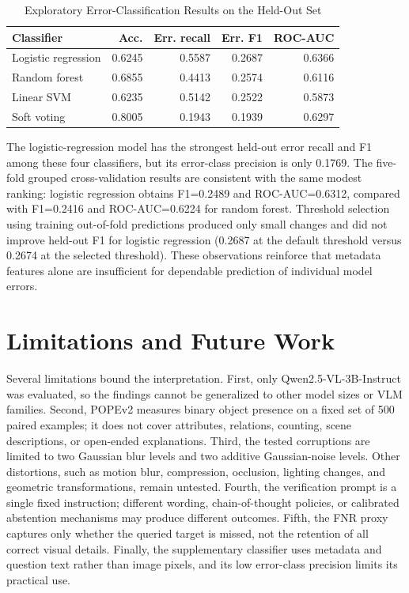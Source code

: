 \documentclass[conference]{IEEEtran}
\begin{document}
\begin{table}[t]
\caption{Exploratory Error-Classification Results on the Held-Out Set}
\label{tab:ml}
\centering
\footnotesize
\begin{tabular}{lrrrr}
\toprule
Classifier & Acc. & Err. recall & Err. F1 & ROC-AUC \\
\midrule
Logistic regression & 0.6245 & 0.5587 & 0.2687 & 0.6366 \\
Random forest & 0.6855 & 0.4413 & 0.2574 & 0.6116 \\
Linear SVM & 0.6235 & 0.5142 & 0.2522 & 0.5873 \\
Soft voting & 0.8005 & 0.1943 & 0.1939 & 0.6297 \\
\bottomrule
\end{tabular}
\end{table}

The logistic-regression model has the strongest held-out error recall and F1 among these four classifiers, but its error-class precision is only 0.1769. The five-fold grouped cross-validation results are consistent with the same modest ranking: logistic regression obtains F1=0.2489 and ROC-AUC=0.6312, compared with F1=0.2416 and ROC-AUC=0.6224 for random forest. Threshold selection using training out-of-fold predictions produced only small changes and did not improve held-out F1 for logistic regression (0.2687 at the default threshold versus 0.2674 at the selected threshold). These observations reinforce that metadata features alone are insufficient for dependable prediction of individual model errors.

\section{Limitations and Future Work}
Several limitations bound the interpretation. First, only Qwen2.5-VL-3B-Instruct was evaluated, so the findings cannot be generalized to other model sizes or VLM families. Second, POPEv2 measures binary object presence on a fixed set of 500 paired examples; it does not cover attributes, relations, counting, scene descriptions, or open-ended explanations. Third, the tested corruptions are limited to two Gaussian blur levels and two additive Gaussian-noise levels. Other distortions, such as motion blur, compression, occlusion, lighting changes, and geometric transformations, remain untested. Fourth, the verification prompt is a single fixed instruction; different wording, chain-of-thought policies, or calibrated abstention mechanisms may produce different outcomes. Fifth, the FNR proxy captures only whether the queried target is missed, not the retention of all correct visual details. Finally, the supplementary classifier uses metadata and question text rather than image pixels, and its low error-class precision limits its practical use.
\end{document}
